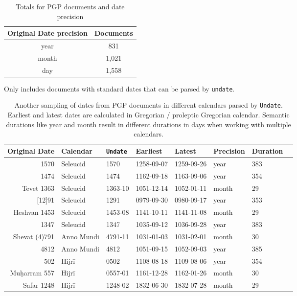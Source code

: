 \documentclass{anthology-ch}         %
\begin{document}
\begin{table}[h]
  \centering 
  \begin{tabular}{cc}
    \toprule
    Original Date precision & Documents \\ 
    \midrule
    year & 831 \\
    month & 1,021 \\
    day & 1,558 \\
    \bottomrule
  \end{tabular}
  \caption{Totals for PGP documents and date precision}
    \medskip
    \small
    Only includes documents with standard dates that can be parsed by \texttt{undate}.
  \label{tab:pgp-date-precisions}
\end{table}

\begin{table}[h]
  \centering 
  \begin{tabular}{rlllllll}
    \toprule
Original Date & Calendar & \texttt{Undate} & Earliest & Latest & Precision & Duration \\ 
\midrule
1570 & Seleucid & 1570 & 1258-09-07 & 1259-09-26 & year & 383 \\
1474 & Seleucid & 1474 & 1162-09-18 & 1163-09-06 & year & 354 \\
Tevet 1363 & Seleucid & 1363-10 & 1051-12-14 & 1052-01-11 & month & 29 \\
{[12]91} & Seleucid & 1291 & 0979-09-30 & 0980-09-17 & year & 353 \\
Heshvan 1453 & Seleucid & 1453-08 & 1141-10-11 & 1141-11-08 & month & 29 \\
1347 & Seleucid & 1347 & 1035-09-12 & 1036-09-28 & year &  383 \\
\midrule
Shevat (4)791 & Anno Mundi & 4791-11 & 1031-01-03 & 1031-02-01 & month & 30 \\
4812 & Anno Mundi & 4812 & 1051-09-15 & 1052-09-03 & year & 385 \\
\midrule
502 & Hijrī & 0502 & 1108-08-18 & 1109-08-06 & year & 354 \\
Muḥarram 557 & Hijrī & 0557-01 & 1161-12-28 & 1162-01-26 & month & 30 \\
Safar 1248 & Hijrī & 1248-02 & 1832-06-30 & 1832-07-28 & month & 29 \\
\bottomrule
    \bottomrule
  \end{tabular}
  \caption{Another sampling of dates from PGP documents in different calendars parsed by \texttt{Undate}. Earliest and latest dates are calculated in Gregorian / proleptic Gregorian calendar. Semantic durations like year and month result in different durations in days when working with multiple calendars.}
  \label{tab:pgp-date-durations}
\end{table}
\end{document}
